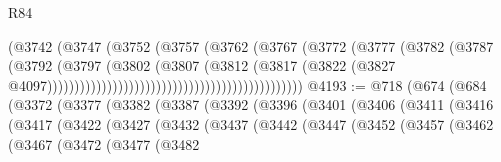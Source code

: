 \begin{lexlean}{R84}
\begin{coremodule}
                                                              (@3742
                                                                (@3747
                                                                  (@3752
                                                                    (@3757
                                                                      (@3762
                                                                        (@3767
                                                                          (@3772
                                                                            (@3777
                                                                              (@3782
                                                                                (@3787
                                                                                  (@3792
                                                                                    (@3797
                                                                                      (@3802
                                                                                        (@3807
                                                                                          (@3812
                                                                                            (@3817
                                                                                              (@3822
                                                                                                (@3827
                                                                                                  @4097)))))))))))))))))))))))))))))))))))))))))))))))
@4193 := @718
    (@674
      (@684
        (@3372
          (@3377
            (@3382
              (@3387
                (@3392
                  (@3396
                    (@3401
                      (@3406
                        (@3411
                          (@3416
                            (@3417
                              (@3422
                                (@3427
                                  (@3432
                                    (@3437
                                      (@3442
                                        (@3447
                                          (@3452
                                            (@3457
                                              (@3462
                                                (@3467
                                                  (@3472
                                                    (@3477
                                                      (@3482

\end{coremodule}
\end{lexlean}

